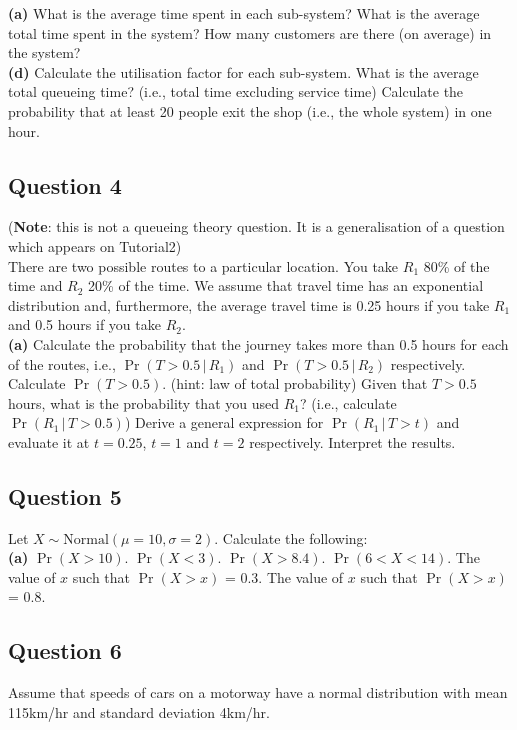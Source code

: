\documentclass[12pt]{article}
\begin{document}
{\bf(a)} What is the average time spent in each sub-system?  What is the average total time spent in the system?  How many customers are there (on average) in the system?  \quad \\{\bf(d)} Calculate the utilisation factor for each sub-system.  What is the average total queueing time? (i.e., total time excluding service time)  Calculate the probability that at least 20 people exit the shop (i.e., the whole system) in one hour.


\subsection*{Question 4}
{\footnotesize({\bf Note}: this is not a queueing theory question. It is a generalisation of a question which appears on Tutorial2)}\\[0.1cm]
There are two possible routes to a particular location. You take $R_1$ 80\% of the time and $R_2$ 20\% of the time. We assume that travel time has an exponential distribution and, furthermore, the average travel time is 0.25 hours if you take $R_1$ and 0.5 hours if you take $R_2$.\\[-0.2cm]

{\bf(a)} Calculate the probability that the journey takes more than 0.5 hours for each of the routes, i.e., $\Pr(T > 0.5\,|\,R_1)$ and $\Pr(T > 0.5\,|\,R_2)$ respectively.  Calculate $\Pr(T > 0.5)$. (hint: law of total probability)  Given that $T>0.5$ hours, what is the probability that you used $R_1$? (i.e., calculate $\Pr(R_1\,|\,T>0.5)$)  Derive a general expression for $\Pr(R_1\,|\,T>t)$ and evaluate it at $t=0.25$, $t = 1$ and $t = 2$ respectively. Interpret the results.



\subsection*{Question 5}
Let $X \sim \text{Normal}(\mu=10,\sigma=2)$. Calculate the following:\\[-0.2cm]

{\bf(a)} $\Pr(X>10)$.  $\Pr(X<3)$.  $\Pr(X>8.4)$.  $\Pr(6<X<14)$.  The value of $x$ such that $\Pr(X>x)$ = 0.3.  The value of $x$ such that $\Pr(X>x)$ = 0.8.


\subsection*{Question 6}
Assume that speeds of cars on a motorway have a normal distribution with mean 115km/hr and standard deviation 4km/hr.\\[-0.2cm]
\end{document}
